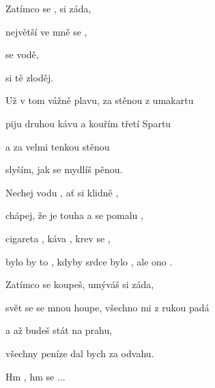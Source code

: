 

\zs
Zatímco se ,  si záda,

 největší  ve mně se ,

 se  vodě,

 si tě  zloděj.
\ks

\zs
Už v tom vážně plavu, za stěnou z umakartu

piju druhou kávu a kouřím třetí Spartu

a za velmi tenkou stěnou

slyším, jak se mydlíš pěnou.
\ks

\zr
Nechej vodu ,  ať si klidně ,

chápej, že  je touha a  se pomalu ,

cigareta , káva , krev se ,

bylo by to , kdyby srdce bylo , ale ono .
\kr

\zs
Zatímco se koupeš, umýváš si záda,

svět se se mnou houpe, všechno mi z rukou padá

a až budeš stát na prahu,

všechny peníze dal bych za odvahu.
\ks

\zr
\kr

Hm   , hm   se ...

\kp
